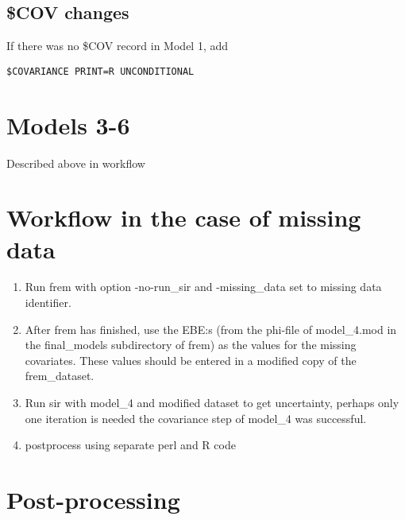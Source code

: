 \subsection{\$COV changes}
If there was no \$COV record in Model 1, add
\begin{verbatim}
$COVARIANCE PRINT=R UNCONDITIONAL
\end{verbatim}


\section{Models 3-6}

Described above in workflow

\section{Workflow in the case of missing data}

\begin{enumerate}
\item Run frem with option -no-run\_sir and -missing\_data set to missing data identifier.
\item After frem has finished, use the EBE:s (from the phi-file of model\_4.mod in the final\_models subdirectory of frem)
as the values for the missing covariates. These values should be entered in a modified copy of the frem\_dataset.
\item Run sir with model\_4 and modified dataset to get uncertainty, perhaps only one iteration is needed
the covariance step of model\_4 was successful.
\item postprocess using separate perl and R code
\end{enumerate}

\section{Post-processing}

